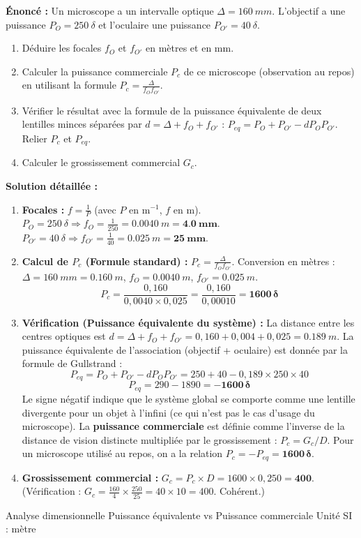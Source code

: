 \documentclass[11pt]{article}
\newcommand{\cle}[1]{{\popxbold\color{popdark}#1}}
\begin{document}
\begin{exoresolu}
\textbf{Énoncé :} Un microscope a un intervalle optique $\Delta = \SI{160}{mm}$. L'objectif a une puissance $P_O = \SI{250}{\delta}$ et l'oculaire une puissance $P_{O'} = \SI{40}{\delta}$.
\begin{enumerate}
    \item Déduire les focales $f_O$ et $f_{O'}$ en mètres et en mm.
    \item Calculer la puissance commerciale $P_c$ de ce microscope (observation au repos) en utilisant la formule $P_c = \frac{\Delta}{f_O f_{O'}}$.
    \item Vérifier le résultat avec la formule de la puissance équivalente de deux lentilles minces séparées par $d = \Delta + f_O + f_{O'}$ : $P_{eq} = P_O + P_{O'} - d P_O P_{O'}$. Relier $P_c$ et $P_{eq}$.
    \item Calculer le grossissement commercial $G_c$.
\end{enumerate}

\tcblower
\textbf{Solution détaillée :}
\begin{enumerate}
    \item \textbf{Focales :} $f = \frac{1}{P}$ (avec $P$ en $\text{m}^{-1}$, $f$ en m).
    $P_O = \SI{250}{\delta} \Rightarrow f_O = \frac{1}{250} = \SI{0,0040}{m} = \mathbf{\SI{4,0}{mm}}$.
    $P_{O'} = \SI{40}{\delta} \Rightarrow f_{O'} = \frac{1}{40} = \SI{0,025}{m} = \mathbf{\SI{25}{mm}}$.
    \item \textbf{Calcul de $P_c$ (Formule standard) :} $P_c = \frac{\Delta}{f_O f_{O'}}$.
    Conversion en mètres : $\Delta = \SI{160}{mm} = \SI{0,160}{m}$, $f_O = \SI{0,0040}{m}$, $f_{O'} = \SI{0,025}{m}$.
    \[ P_c = \frac{0,160}{0,0040 \times 0,025} = \frac{0,160}{0,00010} = \mathbf{1600\,\delta} \]
    \item \textbf{Vérification (Puissance équivalente du système) :}
    La distance entre les centres optiques est $d = \Delta + f_O + f_{O'} = 0,160 + 0,004 + 0,025 = \SI{0,189}{m}$.
    La puissance équivalente de l'association (objectif + oculaire) est donnée par la formule de Gullstrand :
    \[ P_{eq} = P_O + P_{O'} - d P_O P_{O'} = 250 + 40 - 0,189 \times 250 \times 40 \]
    \[ P_{eq} = 290 - 1890 = \mathbf{-1600\,\delta} \]
    Le signe négatif indique que le système global se comporte comme une lentille divergente pour un objet à l'infini (ce qui n'est pas le cas d'usage du microscope).
    La \textbf{puissance commerciale} est définie comme l'inverse de la distance de vision distincte multipliée par le grossissement : $P_c = G_c/D$. Pour un microscope utilisé au repos, on a la relation $P_c = -P_{eq} = \mathbf{1600\,\delta}$.
    \item \textbf{Grossissement commercial :} $G_c = P_c \times D = 1600 \times 0,250 = \mathbf{400}$.
    (Vérification : $G_c = \frac{160}{4} \times \frac{250}{25} = 40 \times 10 = 400$. Cohérent.)
\end{enumerate}
\cle{Analyse dimensionnelle} \cle{Puissance équivalente vs Puissance commerciale} \cle{Unité SI : mètre}
\end{exoresolu}
\end{document}
